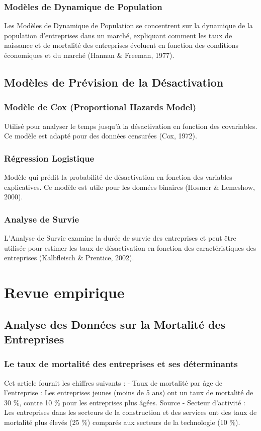 \documentclass[a4paper,12pt]{report}
\begin{document}
\subsubsection{Modèles de Dynamique de Population}
Les Modèles de Dynamique de Population se concentrent sur la dynamique de la population d’entreprises dans un marché, expliquant comment les taux de naissance et de mortalité des entreprises évoluent en fonction des conditions économiques et du marché (Hannan \& Freeman, 1977).
\subsection{Modèles de Prévision de la Désactivation}
\subsubsection{Modèle de Cox (Proportional Hazards Model)}
Utilisé pour analyser le temps jusqu’à la désactivation en fonction des covariables. Ce modèle est adapté pour des données censurées (Cox, 1972).
\subsubsection{Régression Logistique}
Modèle qui prédit la probabilité de désactivation en fonction des variables explicatives. Ce modèle est utile pour les données binaires (Hosmer \& Lemeshow, 2000).
\subsubsection{Analyse de Survie}
L’Analyse de Survie examine la durée de survie des entreprises et peut être utilisée pour estimer les taux de désactivation en fonction des caractéristiques des entreprises (Kalbfleisch \& Prentice, 2002).

\section{Revue empirique}
\subsection{Analyse des Données sur la Mortalité des Entreprises}
\subsubsection{Le taux de mortalité des entreprises et ses déterminants}
Cet article fournit les chiffres suivants : - Taux de mortalité par âge de l’entreprise : Les entreprises jeunes (moins de 5 ans) ont un taux de mortalité de 30 \%, contre 10 \% pour les entreprises plus âgées. Source - Secteur d’activité : Les entreprises dans les secteurs de la construction et des services ont des taux de mortalité plus élevés (25 \%) comparés aux secteurs de la technologie (10 \%).
\end{document}
